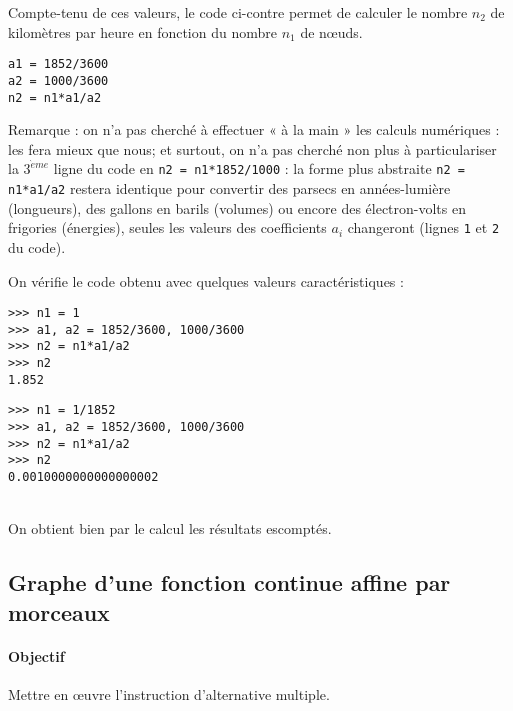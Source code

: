 \documentclass[11pt,a4paper,colorlinks,breaklinks]{article}
\begin{document}
\noindent\begin{minipage}[t]{7cm}
Compte-tenu de ces valeurs, le code ci-contre
permet de calculer le nombre $n_2$ de kilomètres par heure
en fonction du nombre $n_1$ de n\oe uds.
\end{minipage}
\hfill
\begin{minipage}[t]{8cm}
\begin{lstlisting}
a1 = 1852/3600
a2 = 1000/3600
n2 = n1*a1/a2
\end{lstlisting}
\end{minipage}

Remarque : on n'a pas cherché à effectuer « à la main » les calculs numériques :
\python{} les fera mieux que nous; et surtout, on n'a pas cherché non plus à 
particulariser la $3^{\grave eme}$ ligne du code en \texttt{n2 = n1*1852/1000} :
la forme plus abstraite \texttt{n2 = n1*a1/a2} restera identique pour convertir 
des parsecs en années-lumière (longueurs), des gallons en barils (volumes) ou 
encore des électron-volts en frigories (énergies), seules les valeurs des coefficients $a_i$ changeront (lignes \texttt{1} 
et \texttt{2} du code).

On vérifie le code obtenu avec quelques valeurs caractéristiques :\\
\null\hfill\begin{minipage}[t]{7cm}\footnotesize
\begin{Verbatim}
>>> n1 = 1
>>> a1, a2 = 1852/3600, 1000/3600
>>> n2 = n1*a1/a2
>>> n2
1.852
\end{Verbatim}
\end{minipage}
\hfill
\begin{minipage}[t]{7cm}\footnotesize
\begin{Verbatim}
>>> n1 = 1/1852
>>> a1, a2 = 1852/3600, 1000/3600
>>> n2 = n1*a1/a2
>>> n2
0.0010000000000000002
\end{Verbatim}
\end{minipage}\\[2mm]
On obtient bien par le calcul les résultats escomptés.

\subsection{Graphe d'une fonction continue affine par morceaux}\label{subsec:fonction}
\paragraph{Objectif} Mettre en \oe uvre l'instruction d'alternative multiple.
\end{document}
